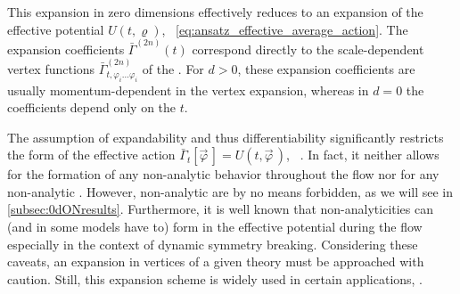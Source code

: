 This expansion in zero dimensions effectively reduces to an expansion of the effective potential $U ( t, \varrho )$, \cf{}\ \cref{eq:ansatz_effective_average_action}.
The \rgscaledependent{} expansion coefficients $\bar{\Gamma}^{(2n)} ( t )$ correspond directly to the scale-dependent vertex functions $\bar{\Gamma}^{(2n)}_{t,\varphi_i \ldots \varphi_i}$ of the \qft{}.
For $d > 0$, these expansion coefficients are usually momentum-dependent in the vertex expansion, whereas in $d = 0$ the coefficients depend only on the \rgtime{} $t$.

The assumption of expandability and thus differentiability significantly restricts the form of the effective action $\bar{\Gamma}_t [ \vec{\varphi} \, ] = U ( t, \vec{\varphi} \, )$, \cf{}\ .
In fact, it neither allows for the formation of any non-analytic behavior throughout the \frg{} flow nor for any non-analytic \ics{}.
However, non-analytic \ics{} are by no means forbidden, as we will see in \cref{subsec:0dONresults}.
Furthermore, it is well known that non-analyticities can (and in some models have to) form in the effective potential during the \frg{} flow~\cite{Aoki:2017rjl,Grossi:2019urj,Grossi:2021ksl,Borchardt:2016pif} \dash{} especially in the context of dynamic symmetry breaking.
Considering these caveats, an expansion in vertices of a given theory must \apriori{} be approached with caution.
Still, this expansion scheme is widely used in certain applications, \cf{} \veRef{}.

